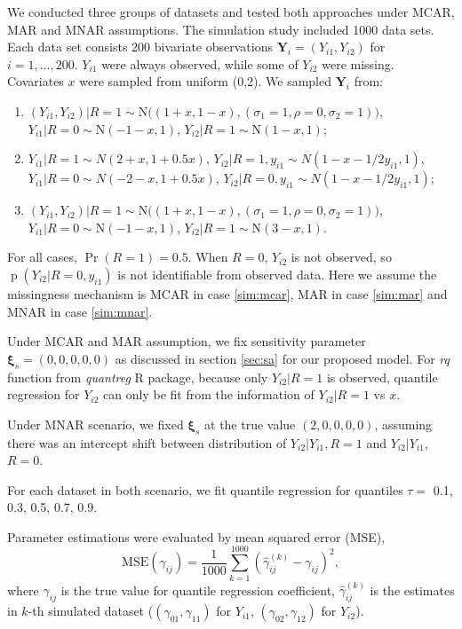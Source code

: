 \documentclass[12pt]{article}
\DeclareMathOperator{\pr}{p}
\DeclareMathOperator{\prob}{Pr}
\begin{document}
We conducted three groups of datasets and tested both approaches under
MCAR, MAR and MNAR assumptions. The simulation study included 1000
data sets. Each data set consists 200 bivariate observations $\bm Y_i
= (Y_{i1}, Y_{i2})$ for $i = 1, \ldots, 200$. $Y_{i1}$ were always
observed, while some of $Y_{i2}$ were missing. Covariates $x$ were
sampled from uniform (0,2). We sampled $\bm Y_i$ from:

\begin{enumerate}
\item \label{sim:mcar} $ ( Y_{i1}, Y_{i2}) |R = 1 \sim \textrm{N}
  \big( (1 + x, 1 - x), (\sigma_1 = 1, \rho = 0 , \sigma_2 = 1)
  \big)$, $ Y_{i1} | R = 0 \sim \textrm{N}(-1-x, 1) $, $ Y_{i2} | R =
  1 \sim \textrm{N}(1-x, 1) $;

\item \label{sim:mar} $ Y_{i1} |R = 1 \sim N ( 2 + x, 1 + 0.5x)$, $
  Y_{i2} | R = 1, y_{i1} \sim N(1 - x - 1/2y_{i1}, 1) $, $ Y_{i1}| R=
  0 \sim N(-2 - x, 1 + 0.5x) $, $ Y_{i2}| R= 0, y_{i1} \sim N(1 - x -
  1/2y_{i1}, 1)$;

\item \label{sim:mnar} $ ( Y_{i1}, Y_{i2}) |R = 1 \sim \textrm{N}
  \big( ( 1 + x, 1 - x), (\sigma_1 = 1, \rho = 0 , \sigma_2 = 1)
  \big)$, $ Y_{i1} | R = 0 \sim \textrm{N}(-1-x, 1) $, $ Y_{i2} | R =
  1 \sim \textrm{N}(3-x, 1) $.
\end{enumerate}

For all cases, $\prob (R = 1) = 0.5$.  When $R = 0$, $Y_{i2}$ is not
observed, so $\pr(Y_{i2}| R = 0, y_{i1})$ is not identifiable from
observed data. Here we assume the missingness mechanism is MCAR in
case \ref{sim:mcar}, MAR in case \ref{sim:mar} and MNAR in case
\ref{sim:mnar}.

Under MCAR and MAR assumption, we fix sensitivity parameter $\bm \xi_s =
(0,0,0,0,0)$ as discussed in section \ref{sec:sa} for our proposed
model. For \textit{rq} function from \textit{quantreg} R package,
because only $Y_{i2}|R = 1$ is observed, quantile regression for
$Y_{i2}$ can only be fit from the information of $Y_{i2}|R = 1$ vs
$x$.

Under MNAR scenario, we fixed $\bm \xi_s$ at the true value $(2, 0, 0,
0, 0)$, assuming there was an intercept shift between distribution of
$Y_{i2}|Y_{i1}, R = 1$ and $Y_{i2}|Y_{i1}$, $R = 0$.

For each dataset in both scenario, we fit quantile regression for
quantiles $\tau =$ 0.1, 0.3, 0.5, 0.7, 0.9.

Parameter estimations were evaluated by mean squared error (MSE),
\begin{equation*}
  \text{MSE} (\gamma_{ij}) = \frac{1}{1000} \sum_{k = 1}^{1000}
  \left( \hat{\gamma}_{ij}^{(k)}  - \gamma_{ij}\right)^2,
\end{equation*}
where $\gamma_{ij}$ is the true value for quantile regression
coefficient, $\hat{\gamma}_{ij}^{(k)}$ is the estimates in $k$-th
simulated dataset ($(\gamma_{01}, \gamma_{11})$ for $Y_{i1}$,
$(\gamma_{02}, \gamma_{12})$ for $Y_{i2}$).
\end{document}
